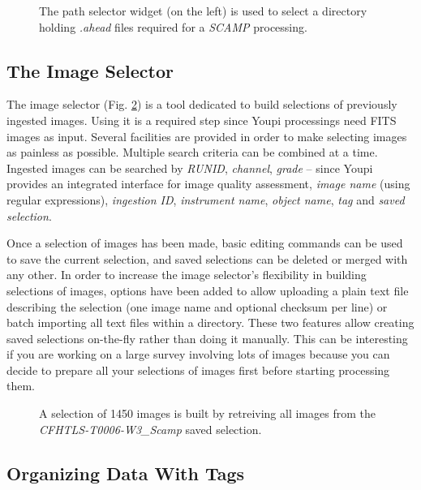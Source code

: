 \documentclass[11pt,twoside]{article}  %
\begin{document}
\begin{figure}[h]
\caption{The path selector widget (on the left) is used to select a directory holding \emph{.ahead} 
files required for a \emph{SCAMP} processing.}\label{fig:browser}
\end{figure}

\subsection{The Image Selector}\label{sec:ims}

The image selector (Fig. \ref{fig:ims}) is a tool dedicated to build selections of previously 
ingested images.  Using it is a required step since Youpi processings need FITS images as input. 
Several facilities are provided in order to make selecting images as painless as possible. 
Multiple search criteria can be combined at a time. Ingested images can be searched by \emph{RUNID}, 
\emph{channel}, \emph{grade} -- since Youpi provides an integrated interface for image 
quality assessment, \emph{image name} (using regular expressions), \emph{ingestion ID}, 
\emph{instrument name}, \emph{object name}, \emph{tag} and \emph{saved selection}.

Once a selection of images has been made, basic editing commands can be used to save the 
current selection, and saved selections can be deleted or merged with any other. In order 
to increase the image selector's flexibility in building selections of images, options have 
been added to allow uploading a plain text file describing the selection (one image name 
and optional checksum per line) or batch importing all text files within a directory. 
These two features allow creating saved selections on-the-fly rather than doing it manually.
This can be interesting if you are working on a large survey involving lots of images because
you can decide to prepare all your selections of images first before starting processing them.

\begin{figure}[h]
\caption{A selection of 1450 images is built by retreiving all images from the 
\emph{CFHTLS-T0006-W3\_Scamp} saved selection.}\label{fig:ims}
\end{figure}

\subsection{Organizing Data With Tags}
\end{document}
